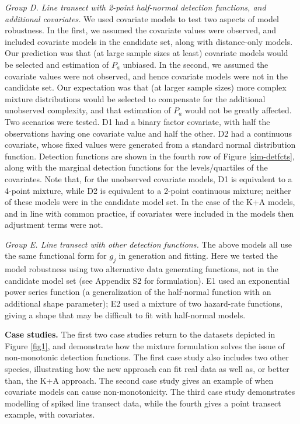 \documentclass[10pt]{article}
\begin{document}
\textit{Group D. Line transect with 2-point half-normal detection functions, and additional covariates.}  We used covariate models to test two aspects of model robustness. In the first, we assumed the covariate values were observed, and included covariate models in the candidate set, along with distance-only models. Our prediction was that (at large sample sizes at least) covariate models would be selected and estimation of $P_a$ unbiased.  In the second, we assumed the covariate values were not observed, and hence covariate models were not in the candidate set.  Our expectation was that (at larger sample sizes) more complex mixture distributions would be selected to compensate for the additional unobserved complexity, and that estimation of $P_a$ would not be greatly affected.  Two scenarios were tested.  D1 had a binary factor covariate, with half the observations having one covariate value and half the other.  D2 had a continuous covariate, whose fixed values were generated from a standard normal distribution function.  Detection functions are shown in the fourth row of Figure \ref{sim-detfcts}, along with the marginal detection functions for the levels/quartiles of the covariates. Note that, for the unobserved covariate models, D1 is equivalent to a 4-point mixture, while D2 is equivalent to a 2-point continuous mixture; neither of these models were in the candidate model set.  In the case of the K+A models, and in line with common practice, if covariates were included in the models then adjustment terms were not.

\textit{Group E. Line transect with other detection functions.} The above models all use the same functional form for $g_j$ in generation and fitting.  Here we tested the model robustness using two alternative data generating functions, not in the candidate model set (see Appendix S2 for formulation).  E1 used an exponential power series function (a generalization of the half-normal function with an additional shape parameter); E2 used a mixture of two hazard-rate functions, giving a shape that may be difficult to fit with half-normal models.

\textbf{Case studies.} The first two case studies return to the datasets depicted in Figure \ref{fig1}, and demonstrate how the mixture formulation solves the issue of non-monotonic detection functions.  The first case study also includes two other species, illustrating how the new approach can fit real data as well as, or better than, the K+A approach. The second case study gives an example of when covariate models can cause non-monotonicity.  The third case study demonstrates modelling of spiked line transect data, while the fourth gives a point transect example, with covariates.
\end{document}
